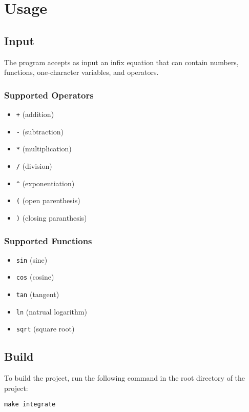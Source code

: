 \documentclass[11pt]{article}
\begin{document}
\section{Usage}
\label{sec:org39d6fd7}

\subsection{Input}
\label{sec:org6ab8e84}
The program accepts as input an infix equation that can contain
numbers, functions, one-character variables, and operators.

\subsubsection{Supported Operators}
\label{sec:org776dd5a}
\begin{itemize}
\item \texttt{+} (addition)
\item \texttt{-} (subtraction)
\item \texttt{*} (multiplication)
\item \texttt{/} (division)
\item \texttt{\textasciicircum{}} (exponentiation)
\item \texttt{(} (open parenthesis)
\item \texttt{)} (closing paranthesis)
\end{itemize}

\subsubsection{Supported Functions}
\label{sec:orgaaa5863}
\begin{itemize}
\item \texttt{sin} (sine)
\item \texttt{cos} (cosine)
\item \texttt{tan} (tangent)
\item \texttt{ln} (natrual logarithm)
\item \texttt{sqrt} (square root)
\end{itemize}

\subsection{Build}
\label{sec:orgaa93e15}
To build the project, run the following command in the root
directory of the project: 

\noindent
\texttt{make integrate}
\end{document}

